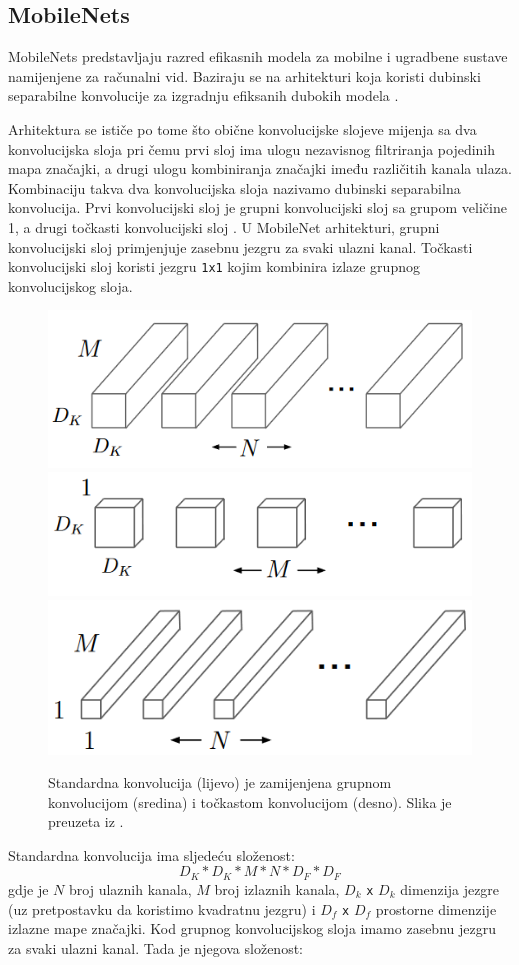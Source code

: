 \documentclass[times, utf8, diplomski,  numeric]{fer}
\begin{document}
\subsection{MobileNets}
MobileNets predstavljaju razred efikasnih modela za mobilne i ugradbene sustave namijenjene za računalni vid. Baziraju se na arhitekturi koja koristi dubinski separabilne konvolucije za izgradnju efiksanih dubokih modela \cite{mobilenets}. \par Arhitektura se ističe po tome što obične konvolucijske slojeve mijenja sa dva konvolucijska sloja pri čemu prvi sloj ima ulogu nezavisnog filtriranja pojedinih mapa značajki, a drugi ulogu kombiniranja značajki imeđu različitih kanala ulaza.  Kombinaciju takva dva konvolucijska sloja nazivamo dubinski separabilna konvolucija. Prvi konvolucijski sloj je grupni konvolucijski sloj sa grupom veličine 1, a drugi točkasti konvolucijski sloj . U MobileNet arhitekturi, grupni konvolucijski sloj primjenjuje zasebnu jezgru za svaki ulazni kanal. Točkasti konvolucijski sloj koristi jezgru \verb|1x1| kojim kombinira izlaze grupnog konvolucijskog sloja. 
\begin{figure}[htp]

\centering
\includegraphics[width=.3\textwidth]{./images/mn1}\hfill
\includegraphics[width=.3\textwidth]{./images/mn2}\hfill
\includegraphics[width=.3\textwidth]{./images/mn3}

\caption{Standardna konvolucija (lijevo) je zamijenjena grupnom konvolucijom (sredina) i točkastom konvolucijom (desno). Slika je preuzeta iz \cite{mobilenets}.}
\label{fig:mobnet}
\end{figure}
\par
Standardna konvolucija ima sljedeću složenost:
\begin{equation}
D_K * D_K * M * N * D_F * D_F
\end{equation}
gdje je $N$ broj ulaznih kanala, $M$ broj izlaznih kanala, $D_k$ \verb|x| $D_k$ dimenzija jezgre (uz pretpostavku da koristimo kvadratnu jezgru) i $D_f$ \verb|x| $D_f$ prostorne dimenzije izlazne mape značajki. Kod grupnog konvolucijskog sloja imamo zasebnu jezgru za svaki ulazni kanal. Tada je njegova složenost: 
\end{document}
